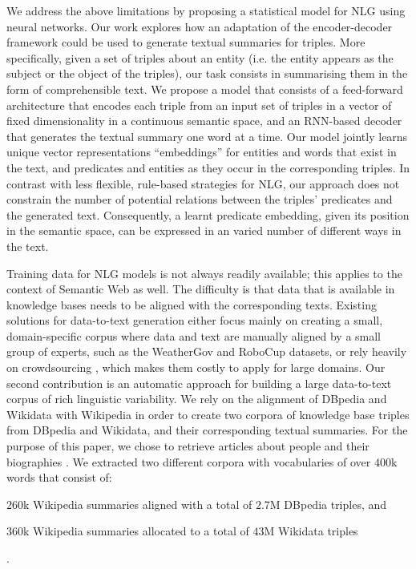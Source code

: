 \documentclass[preprint,5p]{elsarticle}
\begin{document}
We address the above limitations by proposing a statistical model for NLG using neural networks. Our work explores how an adaptation of the encoder-decoder framework \cite{Cho2014,Sutskever2014} could be used to generate textual summaries for triples. More specifically, given a set of triples about an entity (i.e. the entity appears as the subject or the object of the triples), our task consists in summarising them in the form of comprehensible text. We propose a model that consists of a feed-forward architecture that encodes each triple from an input set of triples in a vector of fixed dimensionality in a continuous semantic space, and an RNN-based decoder that generates the textual summary one word at a time. Our model jointly learns unique vector representations ``embeddings'' for entities and words that exist in the text, and predicates and entities as they occur in the corresponding triples. In contrast with less flexible, rule-based strategies for NLG, our approach does not constrain the number of potential relations between the triples' predicates and the generated text. Consequently, a learnt predicate embedding, given its position in the semantic space, can be expressed in an varied number of different ways in the text.


Training data for NLG models is not always readily available; this applies to the context of Semantic Web as well. The difficulty is that data that is available in knowledge bases needs to be aligned with the corresponding texts. Existing solutions for data-to-text generation either focus mainly on creating a small, domain-specific corpus where data and text are manually aligned by a small group of experts, such as the WeatherGov \cite{Liang2009} and RoboCup \cite{Chen2008} datasets, or rely heavily on crowdsourcing \cite{Mrabet2016}, which makes them costly to apply for large domains. Our second contribution is an automatic approach for building a large data-to-text corpus of rich linguistic variability. We rely on the alignment of DBpedia and Wikidata with Wikipedia in order to create two corpora of knowledge base triples from DBpedia and Wikidata, and their corresponding textual summaries. For the purpose of this paper, we chose to retrieve articles about people and their biographies \cite{Lebret2016}. We extracted two different corpora with vocabularies of over $400$k words that consist of: \begin{inparaenum}[(i)]\item $260$k Wikipedia summaries aligned with a total of $2.7$M DBpedia triples, and \item $360$k Wikipedia summaries allocated to a total of $43$M Wikidata triples\end{inparaenum}.
\end{document}
